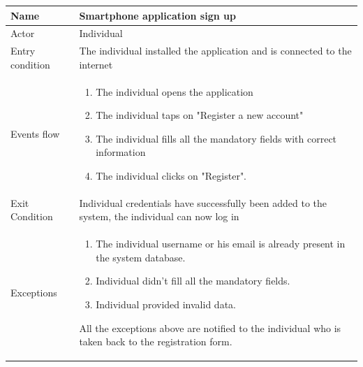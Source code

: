 \begin{table}[p]
\centering
\begin{tabular}{|l|p{11cm}|}
    \hline
    Name & Smartphone application sign up
    \\ \hline
    Actor & Individual
    \\ \hline 
    Entry condition & The individual installed the application and is connected to the internet
    \\ \hline
    Events flow &
    \begin{enumerate}
    \item The individual opens the application
    \item The individual taps on "Register a new account"
    \item The individual fills all the mandatory fields with correct information
    \item The individual clicks on "Register".
    \end{enumerate}
     \\ \hline
     Exit Condition & Individual credentials have successfully been added to the system,
     the individual can now log in     
     \\
    \hline
    Exceptions &
        \begin{enumerate}
    \item The individual username or his email is already present in the system database.
    \item Individual didn't fill all the mandatory fields.
    \item Individual provided invalid data.
    \end{enumerate}
    All the exceptions above are notified to the individual who is taken back to the registration form.
      \\
    \hline
\end{tabular}
\end{table}

